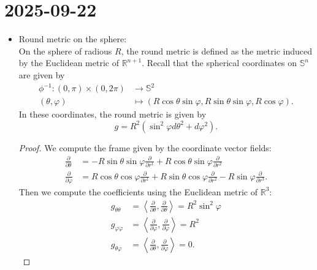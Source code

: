 \documentclass{report}
\begin{document}
\section{2025-09-22}
\begin{itemize}
    \item Round metric on the sphere:\\
    On the sphere of radious $R$, the round metric is defined as the metric induced by the Euclidean metric of $\mathbb R^{n+1}$.
    Recall that the spherical coordinates on $\mathbb S^n$ are given by
    \begin{align*}
        \phi^{-1}: (0,\pi) \times (0,2\pi) &\to \mathbb S^2\\
        (\theta, \varphi) &\mapsto (R \cos \theta \sin \varphi, R \sin \theta \sin \varphi, R \cos \varphi).
    \end{align*}
    In these coordinates, the round metric is given by
    \[
    g = R^2 (\sin^2 \varphi d\theta^2 + d\varphi^2).
    \]
    \begin{proof}
        We compute the frame given by the coordinate vector fields:
        \begin{align*}
            \frac{\partial}{\partial \theta} &= -R \sin \theta \sin \varphi \frac{\partial}{\partial r^1} + R \cos \theta \sin \varphi \frac{\partial}{\partial r^2}  \\
            \frac{\partial}{\partial \varphi} &= R \cos \theta \cos \varphi \frac{\partial}{\partial r^1} + R \sin \theta \cos \varphi \frac{\partial}{\partial r^2} - R \sin \varphi \frac{\partial}{\partial r^3}.
        \end{align*}
        Then we compute the coefficients using the Euclidean metric of $\mathbb R^3$:
    \begin{align*}
        g_{\theta \theta} &= \left\langle \frac{\partial}{\partial \theta}, \frac{\partial}{\partial \theta} \right\rangle = R^2 \sin^2 \varphi\\
        g_{\varphi \varphi} &= \left\langle \frac{\partial}{\partial \varphi}, \frac{\partial}{\partial \varphi} \right\rangle = R^2\\
        g_{\theta \varphi} &= \left\langle \frac{\partial}{\partial \theta}, \frac{\partial}{\partial \varphi} \right\rangle = 0.
    \end{align*}
    \end{proof}
    

\end{itemize}
\end{document}
